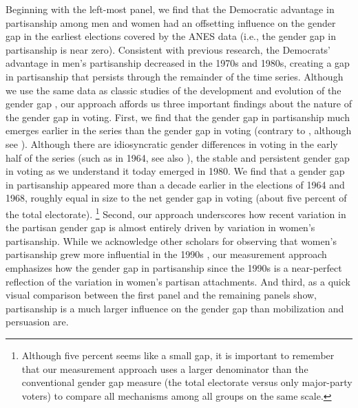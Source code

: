\documentclass[12pt
               ,final
               ]{article}
\begin{document}
Beginning with the left-most panel, we find that the Democratic advantage in partisanship among men and women had an offsetting influence on the gender gap in the earliest elections covered by the ANES data (i.e., the gender gap in partisanship is near zero). Consistent with previous research, the Democrats' advantage in men's partisanship decreased in the 1970s and 1980s, creating a gap in partisanship that persists through the remainder of the time series. Although we use the same data as classic studies of the development and evolution of the gender gap \citep{kaufmann1999changing,norrander1997independence,norrander1999evolution}, our approach affords us three important findings about the nature of the gender gap in voting. First, we find that the gender gap in partisanship much emerges earlier in the series than the gender gap in voting (contrary to \citealt{kaufmann1999changing}, although see \citealt{gillionetal}). Although there are idiosyncratic gender differences in voting in the early half of the series (such as in 1964, see also \citealt{norrander1999evolution}), the stable and persistent gender gap in voting as we understand it today emerged in 1980. We find that a gender gap in partisanship appeared more than a decade earlier in the elections of 1964 and 1968, roughly equal in size to the net gender gap in voting (about five percent of the total electorate).%
  \footnote{Although five percent seems like a small gap, it is important to remember that our measurement approach uses a larger denominator than the conventional gender gap measure (the total electorate versus only major-party voters) to compare all mechanisms among all groups on the same scale.}
Second, our approach underscores how recent variation in the partisan gender gap is almost entirely driven by variation in women's partisanship. While we acknowledge other scholars for observing that women's partisanship grew more influential in the 1990s \citep{box2004dynamics,kaufmann2002culture}, our measurement approach emphasizes how the gender gap in partisanship since the 1990s is a near-perfect reflection of the variation in women's partisan attachments. And third, as a quick visual comparison between the first panel and the remaining panels show, partisanship is a much larger influence on the gender gap than mobilization and persuasion are.
\end{document}
